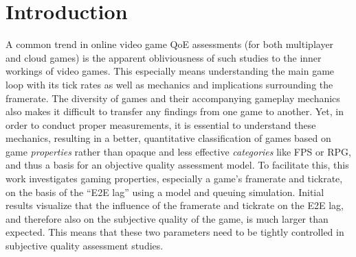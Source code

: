 \section{Introduction}
\label{sec:introduction}

A common trend in online video game \gls{QoE} assessments (for both multiplayer and cloud games) is the apparent obliviousness of such studies to the inner workings of video games. This especially means understanding the main game loop with its tick rates as well as mechanics and implications surrounding the framerate. The diversity of games and their accompanying gameplay mechanics also makes it difficult to transfer any findings from one game to another. Yet, in order to conduct proper measurements, it is essential to understand these mechanics, resulting in a better, quantitative classification of games based on game \textit{properties} rather than opaque and less effective \textit{categories} like \gls{FPS} or \gls{RPG}, and thus a basis for an objective quality assessment model. To facilitate this, this work investigates gaming properties, especially a game's framerate and tickrate, on the basis of the ``\gls{E2E} lag'' using a model and queuing simulation. Initial results visualize that the influence of the framerate and tickrate on the \gls{E2E} lag, and therefore also on the subjective quality of the game, is much larger than expected. This means that these two parameters need to be tightly controlled in subjective quality assessment studies.


